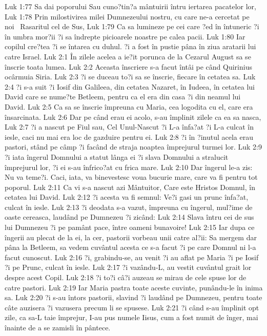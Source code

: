 Luk 1:77  Sa dai poporului Sau cuno?tin?a mântuirii întru iertarea pacatelor lor,
Luk 1:78  Prin milostivirea milei Dumnezeului nostru, cu care ne-a cercetat pe noi  Rasaritul cel de Sus,
Luk 1:79  Ca sa lumineze pe cei care ?ed în întuneric ?i în umbra mor?ii ?i sa îndrepte picioarele noastre pe calea pacii.
Luk 1:80  Iar copilul cre?tea ?i se întarea cu duhul. ?i a fost în pustie pâna în ziua aratarii lui catre Israel.
Luk 2:1  În zilele acelea a ie?it porunca de la Cezarul August sa se înscrie toata lumea.
Luk 2:2  Aceasta înscriere s-a facut întâi pe când Quirinius ocârmuia Siria.
Luk 2:3  ?i se duceau to?i sa se înscrie, fiecare în cetatea sa.
Luk 2:4  ?i s-a suit ?i Iosif din Galileea, din cetatea Nazaret, în Iudeea, în cetatea lui David care se nume?te Betleem, pentru ca el era din casa ?i din neamul lui David.
Luk 2:5  Ca sa se înscrie împreuna cu Maria, cea logodita cu el, care era însarcinata.
Luk 2:6  Dar pe când erau ei acolo, s-au împlinit zilele ca ea sa nasca,
Luk 2:7  ?i a nascut pe Fiul sau, Cel Unul-Nascut ?i L-a înfa?at ?i L-a culcat în iesle, caci nu mai era loc de gazduire pentru ei.
Luk 2:8  ?i în ?inutul acela erau pastori, stând pe câmp ?i facând de straja noaptea împrejurul turmei lor.
Luk 2:9  ?i iata îngerul Domnului a statut lânga ei ?i slava Domnului a stralucit împrejurul lor, ?i ei s-au înfrico?at cu frica mare.
Luk 2:10  Dar îngerul le-a zis: Nu va teme?i. Caci, iata, va binevestesc voua bucurie mare, care va fi pentru tot poporul.
Luk 2:11  Ca vi s-a nascut azi Mântuitor, Care este Hristos Domnul, în cetatea lui David.
Luk 2:12  ?i acesta va fi semnul: Ve?i gasi un prunc înfa?at, culcat în iesle.
Luk 2:13  ?i deodata s-a vazut, împreuna cu îngerul, mul?ime de oaste cereasca, laudând pe Dumnezeu ?i zicând:
Luk 2:14  Slava întru cei de sus lui Dumnezeu ?i pe pamânt pace, între oameni bunavoire!
Luk 2:15  Iar dupa ce îngerii au plecat de la ei, la cer, pastorii vorbeau unii catre al?ii: Sa mergem dar pâna la Betleem, sa vedem cuvântul acesta ce s-a facut ?i pe care Domnul ni l-a facut cunoscut.
Luk 2:16  ?i, grabindu-se, au venit ?i au aflat pe Maria ?i pe Iosif ?i pe Prunc, culcat în iesle.
Luk 2:17  ?i vazându-L, au vestit cuvântul grait lor despre acest Copil.
Luk 2:18  ?i to?i câ?i auzeau se mirau de cele spuse lor de catre pastori.
Luk 2:19  Iar Maria pastra toate aceste cuvinte, punându-le în inima sa.
Luk 2:20  ?i s-au întors pastorii, slavind ?i laudând pe Dumnezeu, pentru toate câte auzisera ?i vazusera precum li se spusese.
Luk 2:21  ?i când s-au împlinit opt zile, ca sa-L taie împrejur, I-au pus numele Iisus, cum a fost numit de înger, mai înainte de a se zamisli în pântece.
